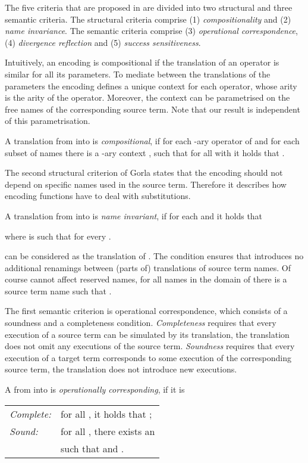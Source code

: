 \documentclass[]{article}
\begin{document}
The five criteria that are proposed in \cite{gorla} are divided into two structural and three semantic criteria. The structural criteria comprise (1) \emph{compositionality} and (2) \emph{name invariance}. The semantic criteria comprise (3) \emph{operational correspondence}, (4) \emph{divergence reflection} and (5) \emph{success sensitiveness}.

Intuitively, an encoding is compositional if the translation of an operator is similar for all its parameters. To mediate between the translations of the parameters the encoding defines a unique context for each operator, whose arity is the arity of the operator. Moreover, the context can be parametrised on the free names of the corresponding source term. Note that our result is independent of this parametrisation.

\bkrit[Compositionality]
	\label{comp}
	A translation  from  into  is \emph{compositional}, if for each -ary operator  of  and for each subset of names  there is a -ary context , such that for all  with  it holds that .
\ekrit

The second structural criterion of Gorla states that the encoding should not depend on specific names used in the source term. Therefore it describes how encoding functions have to deal with substitutions.

	\label{ninv}
	A translation  from  into  is \emph{name invariant}, if for each  and  it holds that 
 
where  is such that  for every .
\ekrit

 can be considered as the translation of . The condition  ensures that  introduces no additional renamings between (parts of) translations of source term names. Of course  cannot affect reserved names, \ie for all names  in the domain of  there is a source term name  such that .

The first semantic criterion is operational correspondence, which consists of a soundness and a completeness condition.
\emph{Completeness} requires that every execution of a source term can be simulated by its translation, \ie the translation does not omit any executions of the source term. \emph{Soundness} requires that every execution of a target term corresponds to some execution of the corresponding source term, \ie the translation does not introduce new executions.

	\label{opco}
	A  from  into  is \emph{operationally corresponding}, if it is\\
	\begin{tabular}{l@{\;\;}l}
		\emph{Complete:} & for all , it holds that ;\\
		\emph{Sound:} & for all , there exists an \\
		& such that  and .
	\end{tabular}
\ekrit
\end{document}
